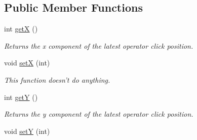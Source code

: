 \subsection*{Public Member Functions}
\begin{DoxyCompactItemize}
\item 
\hypertarget{class_picto_1_1_operator_click_parameter_ab83929ebed409f0b0151cfc86a067b8d}{int \hyperlink{class_picto_1_1_operator_click_parameter_ab83929ebed409f0b0151cfc86a067b8d}{get\-X} ()}\label{class_picto_1_1_operator_click_parameter_ab83929ebed409f0b0151cfc86a067b8d}

\begin{DoxyCompactList}\small\item\em Returns the x component of the latest operator click position. \end{DoxyCompactList}\item 
\hypertarget{class_picto_1_1_operator_click_parameter_a16ebfcdc104b5a2a103b05e597ad8567}{void \hyperlink{class_picto_1_1_operator_click_parameter_a16ebfcdc104b5a2a103b05e597ad8567}{set\-X} (int)}\label{class_picto_1_1_operator_click_parameter_a16ebfcdc104b5a2a103b05e597ad8567}

\begin{DoxyCompactList}\small\item\em This function doesn't do anything. \end{DoxyCompactList}\item 
\hypertarget{class_picto_1_1_operator_click_parameter_a3b86e365bfd0f2e96547846fe10330e4}{int \hyperlink{class_picto_1_1_operator_click_parameter_a3b86e365bfd0f2e96547846fe10330e4}{get\-Y} ()}\label{class_picto_1_1_operator_click_parameter_a3b86e365bfd0f2e96547846fe10330e4}

\begin{DoxyCompactList}\small\item\em Returns the y component of the latest operator click position. \end{DoxyCompactList}\item 
\hypertarget{class_picto_1_1_operator_click_parameter_a3a5f9b552cc001a517c315cef8324e04}{void \hyperlink{class_picto_1_1_operator_click_parameter_a3a5f9b552cc001a517c315cef8324e04}{set\-Y} (int)}\label{class_picto_1_1_operator_click_parameter_a3a5f9b552cc001a517c315cef8324e04}


\end{DoxyCompactItemize}
